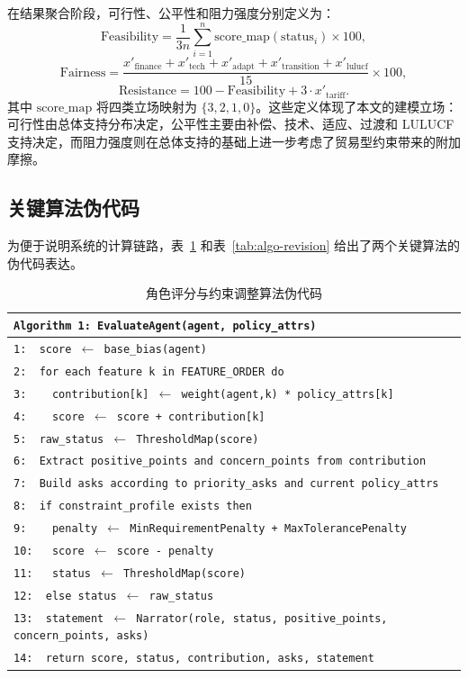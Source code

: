 \documentclass[12pt,a4paper]{ctexart}
\begin{document}
在结果聚合阶段，可行性、公平性和阻力强度分别定义为：
\[
\mathrm{Feasibility}=\frac{1}{3n}\sum_{i=1}^{n}\mathrm{score\_map}(\mathrm{status}_i)\times 100,
\]
\[
\mathrm{Fairness}=\frac{x'_{\mathrm{finance}}+x'_{\mathrm{tech}}+x'_{\mathrm{adapt}}+x'_{\mathrm{transition}}+x'_{\mathrm{lulucf}}}{15}\times 100,
\]
\[
\mathrm{Resistance}=100-\mathrm{Feasibility}+3 \cdot x'_{\mathrm{tariff}}.
\]
其中 \(\mathrm{score\_map}\) 将四类立场映射为 \(\{3,2,1,0\}\)。这些定义体现了本文的建模立场：可行性由总体支持分布决定，公平性主要由补偿、技术、适应、过渡和 LULUCF 支持决定，而阻力强度则在总体支持的基础上进一步考虑了贸易型约束带来的附加摩擦。

\subsection{关键算法伪代码}
为便于说明系统的计算链路，表~\ref{tab:algo-agent} 和表~\ref{tab:algo-revision} 给出了两个关键算法的伪代码表达。

\begin{table}[H]
\centering
\caption{角色评分与约束调整算法伪代码}
\label{tab:algo-agent}
\begin{tabularx}{\textwidth}{X}
\toprule
\texttt{Algorithm 1: EvaluateAgent(agent, policy\_attrs)} \\
\midrule
\texttt{1:\ \ score $\leftarrow$ base\_bias(agent)} \\
\texttt{2:\ \ for each feature k in FEATURE\_ORDER do} \\
\texttt{3:\ \ \ \ contribution[k] $\leftarrow$ weight(agent,k) * policy\_attrs[k]} \\
\texttt{4:\ \ \ \ score $\leftarrow$ score + contribution[k]} \\
\texttt{5:\ \ raw\_status $\leftarrow$ ThresholdMap(score)} \\
\texttt{6:\ \ Extract positive\_points and concern\_points from contribution} \\
\texttt{7:\ \ Build asks according to priority\_asks and current policy\_attrs} \\
\texttt{8:\ \ if constraint\_profile exists then} \\
\texttt{9:\ \ \ \ penalty $\leftarrow$ MinRequirementPenalty + MaxTolerancePenalty} \\
\texttt{10:\ \ \ score $\leftarrow$ score - penalty} \\
\texttt{11:\ \ \ status $\leftarrow$ ThresholdMap(score)} \\
\texttt{12:\ \ else status $\leftarrow$ raw\_status} \\
\texttt{13:\ \ statement $\leftarrow$ Narrator(role, status, positive\_points, concern\_points, asks)} \\
\texttt{14:\ \ return score, status, contribution, asks, statement} \\
\bottomrule
\end{tabularx}
\end{table}
\end{document}
